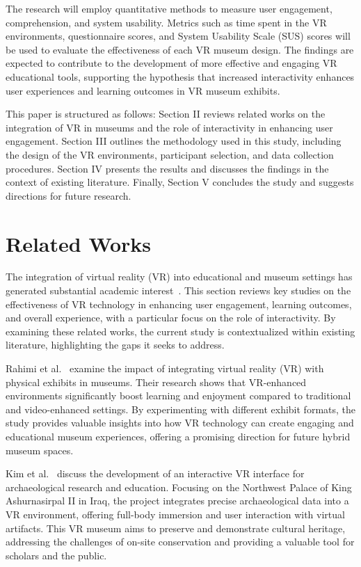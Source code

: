 \documentclass[conference]{IEEEtran}
\begin{document}
The research will employ quantitative methods to measure user engagement, comprehension, and system usability. Metrics such as time spent in the VR environments, questionnaire scores, and System Usability Scale (SUS) scores will be used to evaluate the effectiveness of each VR museum design. The findings are expected to contribute to the development of more effective and engaging VR educational tools, supporting the hypothesis that increased interactivity enhances user experiences and learning outcomes in VR museum exhibits.

This paper is structured as follows: Section II reviews related works on the integration of VR in museums and the role of interactivity in enhancing user engagement. Section III outlines the methodology used in this study, including the design of the VR environments, participant selection, and data collection procedures. Section IV presents the results and discusses the findings in the context of existing literature. Finally, Section V concludes the study and suggests directions for future research.

\section{Related Works}
The integration of virtual reality (VR) into educational and museum settings has generated substantial academic interest~\cite{7295086, 9590647, 9329425}. This section reviews key studies on the effectiveness of VR technology in enhancing user engagement, learning outcomes, and overall experience, with a particular focus on the role of interactivity. By examining these related works, the current study is contextualized within existing literature, highlighting the gaps it seeks to address.

Rahimi et al.~\cite{9286680} examine the impact of integrating virtual reality (VR) with physical exhibits in museums. Their research shows that VR-enhanced environments significantly boost learning and enjoyment compared to traditional and video-enhanced settings. By experimenting with different exhibit formats, the study provides valuable insights into how VR technology can create engaging and educational museum experiences, offering a promising direction for future hybrid museum spaces.

Kim et al.~\cite{6797425} discuss the development of an interactive VR interface for archaeological research and education. Focusing on the Northwest Palace of King Ashurnasirpal II in Iraq, the project integrates precise archaeological data into a VR environment, offering full-body immersion and user interaction with virtual artifacts. This VR museum aims to preserve and demonstrate cultural heritage, addressing the challenges of on-site conservation and providing a valuable tool for scholars and the public.
\end{document}
